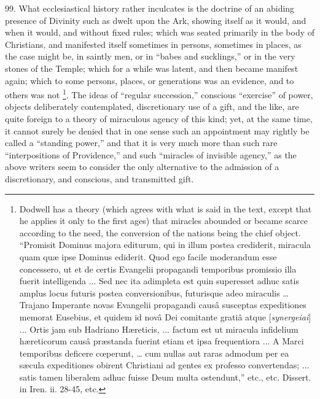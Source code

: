 99.
What ecclesiastical history rather inculcates is the doctrine of an
abiding presence of Divinity such as dwelt upon the Ark, showing
itself as it would, and when it would, and without fixed rules; which
was seated primarily in the body of Christians, and manifested
itself sometimes in persons, sometimes in places, as the case might
be, in saintly men, or in ``babes and sucklings,'' or in the very stones
of the Temple; which for a while was latent, and then became manifest
again; which to some persons, places, or generations was an evidence,
and to others was not \footnote{Dodwell has a theory (which agrees with what is said in the text,
except that he applies it only to the first ages) that miracles
abounded or became scarce according to the need, the conversion of the
nations being the chief object. ``Promisit Dominus majora editurum, qui
in illum postea crediderit, miracula quam quæ ipse Dominus ediderit.
Quod ego facile moderandum esse concessero, ut et de certis Evangelii
propagandi temporibus promissio illa fuerit intelligenda ... Sed nec
ita adimpleta est quin superesset adhuc satis amplus locus futuris
postea conversionibus, futurisque adeo miraculis … Trajano Imperante
novas Evangelii propagandi causâ susceptas expeditiones memorat
Eusebius, et quidem id novâ Dei comitante gratiâ atque [\emph{synergeiai}]
... Ortis jam sub Hadriano Hæreticis, ... factum est ut miracula
infidelium hæreticorum causâ præstanda fuerint etiam et ipsa
frequentiora ... A Marci temporibus deficere cœperunt, … cum nullas
aut raras admodum per ea sæcula expeditiones obirent Christiani ad
gentes ex professo convertendas; ... satis tamen liberalem adhuc
fuisse Deum multa ostendunt,'' etc., etc. Dissert. in Iren. ii. 28-45,
etc.}.
The ideas of ``regular succession,'' conscious ``exercise'' of power,
objects deliberately contemplated, discretionary use of a gift, and
the like, are quite foreign to a theory of miraculous agency of this
kind; yet, at the same time, it cannot surely be denied that in one
sense such an appointment may rightly be called a ``standing
power,'' and that it is very much more than such rare ``interpositions
of Providence,'' and such ``miracles of invisible agency,'' as the above
writers seem to consider the only alternative to the admission of a
discretionary, and conscious, and transmitted gift.

